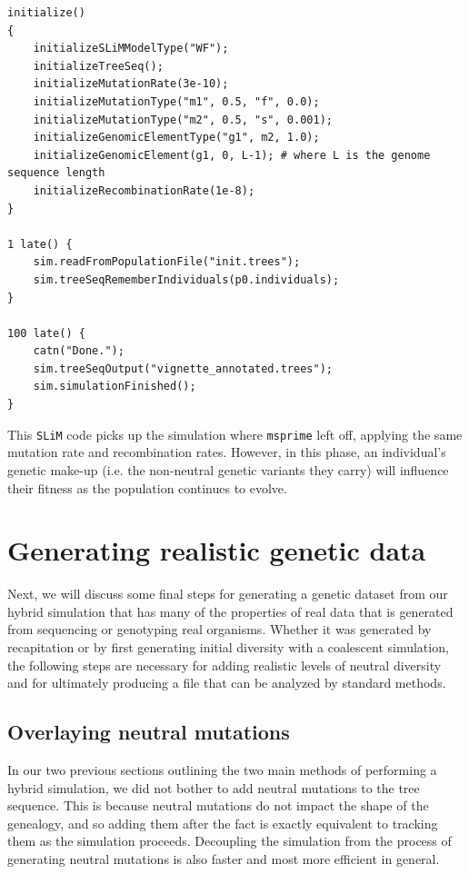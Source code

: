 \documentclass[12pt]{article}
\newcommand{\msprime}[0]{\texttt{msprime}\xspace}
\newcommand{\slim}[0]{\texttt{SLiM}\xspace}
\begin{document}
\begin{verbatim}
initialize()
{
    initializeSLiMModelType("WF");
    initializeTreeSeq();
    initializeMutationRate(3e-10);
    initializeMutationType("m1", 0.5, "f", 0.0);
    initializeMutationType("m2", 0.5, "s", 0.001);
    initializeGenomicElementType("g1", m2, 1.0);
    initializeGenomicElement(g1, 0, L-1); # where L is the genome sequence length
    initializeRecombinationRate(1e-8);
}

1 late() { 
    sim.readFromPopulationFile("init.trees");
    sim.treeSeqRememberIndividuals(p0.individuals);
}

100 late() {
    catn("Done.");
    sim.treeSeqOutput("vignette_annotated.trees");
    sim.simulationFinished();
}
\end{verbatim}

This \slim code picks up the simulation where \msprime left off, applying the same mutation rate and recombination rates. However, in this phase,
an individual's genetic make-up (i.e. the non-neutral genetic variants they carry) will influence their fitness as the population continues to evolve.

\section{Generating realistic genetic data}

Next, we will discuss some final steps for generating a genetic dataset from our hybrid simulation that has many of the properties of real data that is generated from
sequencing or genotyping real organisms. Whether it was generated by recapitation or by first generating initial
diversity with a coalescent simulation, the following steps are necessary for adding realistic levels of neutral diversity and for ultimately producing a
file that can be analyzed by standard methods.

\subsection {Overlaying neutral mutations}

In our two previous sections outlining the two main methods of performing a hybrid simulation, we did not bother to add neutral mutations to the tree sequence.
This is because neutral mutations do not impact the shape of the genealogy, and so adding them after the fact is exactly equivalent to tracking them as the
simulation proceeds. Decoupling the simulation from the process of generating neutral mutations is also faster and most more efficient in general.
\end{document}
